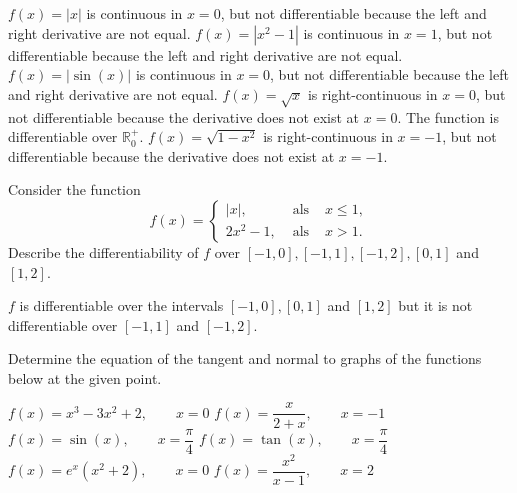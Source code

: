 \begin{Answer}\phantom{}
    
			\Question $f(x)=|x|$ is continuous in $x=0$, but not differentiable because the left and right derivative are not equal. 
			\Question $f(x)=|x^2-1|$ is continuous in $x=1$,  but not differentiable because the left and right derivative are not equal. 
			\Question $f(x)=|\sin (x)|$  is continuous in $x=0$,  but not differentiable because the left and right derivative are not equal. 
			\Question $f(x)=\sqrt{x}$ is right-continuous in $x=0$, but not differentiable because the derivative does not exist at $x=0$. The function is differentiable over $\mathbb{R}_0^+$. 
			\Question $f(x)=\sqrt{1-x^2}$ is right-continuous in $x=-1$, but not differentiable because the derivative does not exist at $x=-1$.
		
\end{Answer}

\ifanalysis
\begin{Exercise}[difficulty = 2] Consider the function
	\[ f(x) = \left\{  \begin{array}{rcl} |x|, & \text{ als } & x \leq 1, \\
	2x^2-1, &\text{ als } & x >1. \end{array} \right.
	\]
	Describe the differentiability of $f$ over $[-1,0], [-1,1], [-1,2], [0,1]$ and $[1,2]$.

\end{Exercise}

\begin{Answer}\phantom{}
    $f$ is differentiable over the intervals $[-1,0], [0,1]$ and $[1,2]$ but it is not differentiable over $[-1,1]$ and $[-1,2]$.
\end{Answer}
\fi


\begin{Exercise} Determine the equation of the tangent and normal to graphs of the functions below at the given point. 
	\begin{multicols}{2}
    	\Question[difficulty = 1] $f(x)=x^3-3x^2+2, \qquad x=0$
    	\Question[difficulty = 1] $f(x)=\dfrac{x}{2+x} , \qquad  x=-1$ 
    	\Question[difficulty = 1] $f(x)=\sin (x), \qquad x=\dfrac{\pi}{4}$
    	\Question[difficulty = 1] $f(x)=\tan (x), \qquad x=\dfrac{\pi}{4}$
    	\Question[difficulty = 1] $f(x)= e^x \left( x^2+2 \right), \qquad x=0$
    	\Question[difficulty = 1] $f(x)= \dfrac{x^2}{x-1}, \qquad x=2$
    	\EndCurrentQuestion
	\end{multicols}

\end{Exercise}

